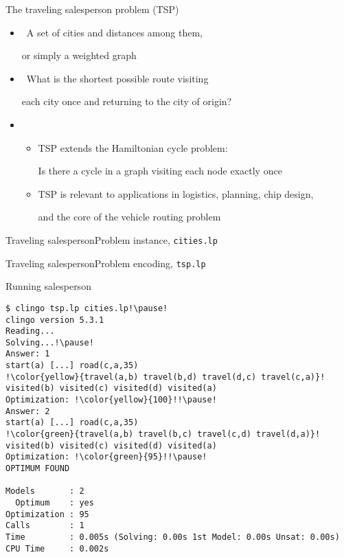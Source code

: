 \begin{frame}[c]{The traveling salesperson problem (TSP)}
  \begin{itemize}
  \item {} \ A set of cities and distances among them,

    or simply a weighted graph
    \smallskip
  \item {} \ What is the shortest possible route visiting

    each city once and returning to the city of origin?
    \bigskip
  \item<2-> 
    \begin{itemize}
    \item TSP extends the Hamiltonian cycle problem:
      \par
      Is there a cycle in a graph visiting each node exactly once
      \smallskip
    \item TSP is relevant to applications in logistics, planning, chip design,

      and the core of the vehicle routing problem
    \end{itemize}
  \end{itemize}
\end{frame}
\begin{frame}[fragile]{Traveling salesperson}{Problem instance, \texttt{cities.lp}}

\end{frame}
\begin{frame}[fragile]{Traveling salesperson}{Problem encoding, \texttt{tsp.lp}}

%
\end{frame}
\begin{frame}{Running salesperson}
\begin{lstlisting}[escapechar=!]
$ clingo tsp.lp cities.lp!\pause!
clingo version 5.3.1
Reading...
Solving...!\pause!
Answer: 1
start(a) [...] road(c,a,35)
!\color{yellow}{travel(a,b) travel(b,d) travel(d,c) travel(c,a)}!
visited(b) visited(c) visited(d) visited(a)
Optimization: !\color{yellow}{100}!!\pause!
Answer: 2
start(a) [...] road(c,a,35)
!\color{green}{travel(a,b) travel(b,c) travel(c,d) travel(d,a)}!
visited(b) visited(c) visited(d) visited(a)
Optimization: !\color{green}{95}!!\pause!
OPTIMUM FOUND

Models       : 2
  Optimum    : yes
Optimization : 95
Calls        : 1
Time         : 0.005s (Solving: 0.00s 1st Model: 0.00s Unsat: 0.00s)
CPU Time     : 0.002s
\end{lstlisting}
\end{frame}
